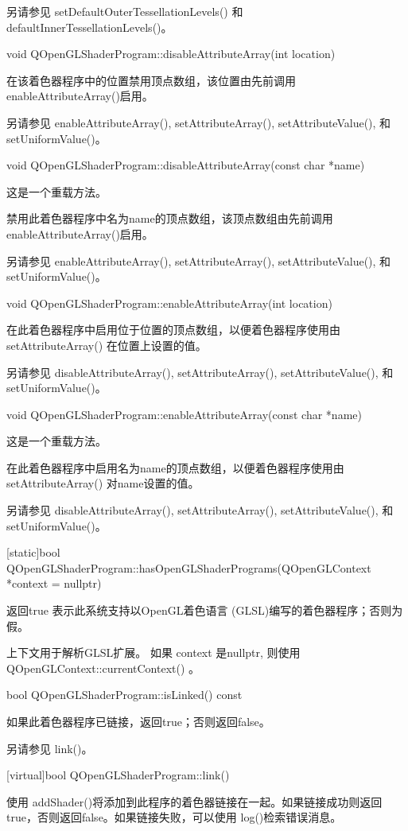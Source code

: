另请参见 setDefaultOuterTessellationLevels() 和 defaultInnerTessellationLevels()。

void QOpenGLShaderProgram::disableAttributeArray(int location)

在该着色器程序中的位置禁用顶点数组，该位置由先前调用 enableAttributeArray()启用。

另请参见 enableAttributeArray(), setAttributeArray(), setAttributeValue(), 和 setUniformValue()。

void QOpenGLShaderProgram::disableAttributeArray(const char *name)

这是一个重载方法。

禁用此着色器程序中名为name的顶点数组，该顶点数组由先前调用 enableAttributeArray()启用。

另请参见 enableAttributeArray(), setAttributeArray(), setAttributeValue(), 和 setUniformValue()。

void QOpenGLShaderProgram::enableAttributeArray(int location)

在此着色器程序中启用位于位置的顶点数组，以便着色器程序使用由 setAttributeArray() 在位置上设置的值。

另请参见 disableAttributeArray(), setAttributeArray(), setAttributeValue(), 和 setUniformValue()。

void QOpenGLShaderProgram::enableAttributeArray(const char *name)

这是一个重载方法。

在此着色器程序中启用名为name的顶点数组，以便着色器程序使用由 setAttributeArray() 对name设置的值。

另请参见 disableAttributeArray(), setAttributeArray(), setAttributeValue(), 和 setUniformValue()。

[static]bool QOpenGLShaderProgram::hasOpenGLShaderPrograms(QOpenGLContext *context = nullptr)

返回true 表示此系统支持以OpenGL着色语言 (GLSL)编写的着色器程序；否则为假。

上下文用于解析GLSL扩展。 如果 context 是nullptr, 则使用QOpenGLContext::currentContext() 。

bool QOpenGLShaderProgram::isLinked() const

如果此着色器程序已链接，返回true；否则返回false。

另请参见 link()。

[virtual]bool QOpenGLShaderProgram::link()

使用 addShader()将添加到此程序的着色器链接在一起。如果链接成功则返回true，否则返回false。如果链接失败，可以使用 log()检索错误消息。

